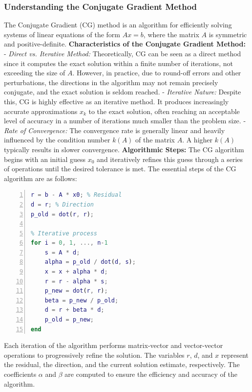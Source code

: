 \documentclass[unicode,11pt,a4paper,oneside,numbers=endperiod,openany]{scrartcl}
\begin{document}
\subsubsection{Understanding the Conjugate Gradient Method}
The Conjugate Gradient (CG) method is an algorithm for efficiently solving systems of linear equations of the form \( Ax = b \), where the matrix \( A \) is symmetric and positive-definite.
\newline \newline
\textbf{Characteristics of the Conjugate Gradient Method:}\newline\newline
- \textit{Direct vs. Iterative Method:} Theoretically, CG can be seen as a direct method since it computes the exact solution within a finite number of iterations, not exceeding the size of \( A \). However, in practice, due to round-off errors and other perturbations, the directions in the algorithm may not remain precisely conjugate, and the exact solution is seldom reached.\newline \newline
- \textit{Iterative Nature:} Despite this, CG is highly effective as an iterative method. It produces increasingly accurate approximations \( x_k \) to the exact solution, often reaching an acceptable level of accuracy in a number of iterations much smaller than the problem size.\newline\newline
- \textit{Rate of Convergence:} The convergence rate is generally linear and heavily influenced by the condition number \( k(A) \) of the matrix \( A \). A higher \( k(A) \) typically results in slower convergence.
\newline\newline
\textbf{Algorithmic Steps:}
The CG algorithm begins with an initial guess \( x_0 \) and iteratively refines this guess through a series of operations until the desired tolerance is met. The essential steps of the CG algorithm are as follows:
\newline \newline
\begin{lstlisting}[language=Matlab, numbers=left]
% Initialize variables
r = b - A * x0; % Residual
d = r; % Direction
p_old = dot(r, r);

% Iterative process
for i = 0, 1, ..., n-1
    s = A * d;
    alpha = p_old / dot(d, s);
    x = x + alpha * d;
    r = r - alpha * s;
    p_new = dot(r, r);
    beta = p_new / p_old;
    d = r + beta * d;
    p_old = p_new;
end
\end{lstlisting}
Each iteration of the algorithm performs matrix-vector and vector-vector operations to progressively refine the solution. The variables \( r \), \( d \), and \( x \) represent the residual, the direction, and the current solution estimate, respectively. The coefficients \( \alpha \) and \( \beta \) are computed to ensure the efficiency and accuracy of the algorithm.
\end{document}
